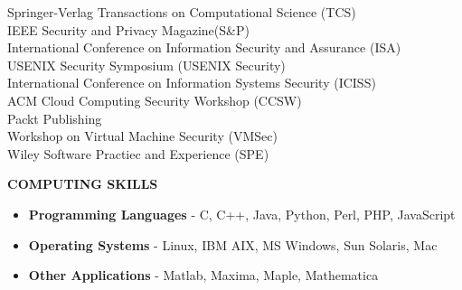 \documentclass[10pt]{article}
\begin{document}
\begin{itemize}
    Springer-Verlag Transactions on Computational Science (TCS)\\
    IEEE Security and Privacy Magazine(S\&P)\\
    International Conference on Information Security and Assurance (ISA)\\
    USENIX Security Symposium (USENIX Security)\\
    International Conference on Information Systems Security (ICISS)\\
    ACM Cloud Computing Security Workshop (CCSW)\\
    Packt Publishing\\
    Workshop on Virtual Machine Security (VMSec)\\
    Wiley Software Practiec and Experience (SPE)

\end{itemize}

\vspace{1em} {\large \textbf{COMPUTING SKILLS}}
\begin{itemize}
\item \textbf{Programming Languages} - C, C++, Java, Python, Perl, PHP, JavaScript
\item \textbf{Operating Systems} - Linux, IBM AIX, MS Windows, Sun Solaris, Mac
\item \textbf{Other Applications} - Matlab, Maxima, Maple, Mathematica

\end{itemize}

\nocite{*}



\end{document}
